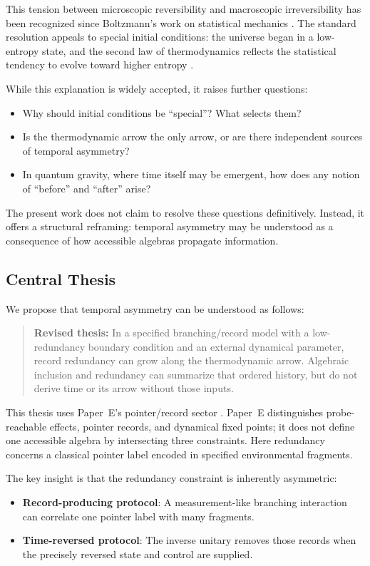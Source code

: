 \documentclass[12pt,a4paper,openany]{book}
\begin{document}
This tension between microscopic reversibility and macroscopic irreversibility has been recognized since Boltzmann's work on statistical mechanics \cite{Boltzmann1896}. The standard resolution appeals to special initial conditions: the universe began in a low-entropy state, and the second law of thermodynamics reflects the statistical tendency to evolve toward higher entropy \cite{Penrose1989,Carroll2010}.

While this explanation is widely accepted, it raises further questions:
\begin{itemize}
    \item Why should initial conditions be ``special''? What selects them?
    \item Is the thermodynamic arrow the only arrow, or are there independent sources of temporal asymmetry?
    \item In quantum gravity, where time itself may be emergent, how does any notion of ``before'' and ``after'' arise?
\end{itemize}

The present work does not claim to resolve these questions definitively. Instead, it offers a structural reframing: temporal asymmetry may be understood as a consequence of how accessible algebras propagate information.

\subsection{Central Thesis}

We propose that temporal asymmetry can be understood as follows:

\begin{quote}
\textbf{Revised thesis:} In a specified branching/record model with a low-redundancy boundary condition and an external dynamical parameter, record redundancy can grow along the thermodynamic arrow.  Algebraic inclusion and redundancy can summarize that ordered history, but do not derive time or its arrow without those inputs.
\end{quote}

This thesis uses Paper~E's pointer/record sector \cite{Liu2026PaperE}.  Paper~E distinguishes probe-reachable effects, pointer records, and dynamical fixed points; it does not define one accessible algebra by intersecting three constraints.  Here redundancy concerns a classical pointer label encoded in specified environmental fragments.

The key insight is that the redundancy constraint is inherently asymmetric:
\begin{itemize}
    \item \textbf{Record-producing protocol}: A measurement-like branching interaction can correlate one pointer label with many fragments.
    \item \textbf{Time-reversed protocol}: The inverse unitary removes those records when the precisely reversed state and control are supplied.
\end{itemize}
\end{document}
